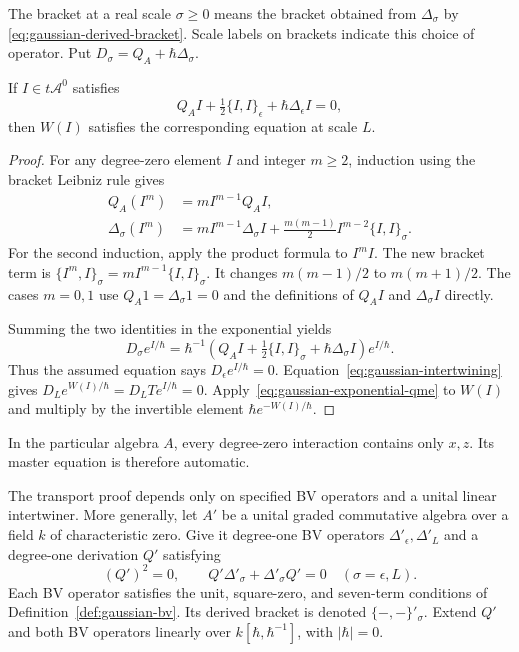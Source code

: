 The bracket at a real scale $\sigma\geq0$ means the bracket obtained from
$\Delta_\sigma$ by
\eqref{eq:gaussian-derived-bracket}. Scale labels on brackets indicate
this choice of operator.
Put $D_\sigma=Q_A+\hbar\Delta_\sigma$.

\begin{proposition}\label{prop:gaussian-qme-transport}
If $I\in t\mathcal A^0$ satisfies
\[
 Q_AI+\tfrac12\{I,I\}_\epsilon+\hbar\Delta_\epsilon I=0,
\]
then $W(I)$ satisfies the corresponding equation at scale $L$.
\end{proposition}

\begin{proof}
For any degree-zero element $I$ and integer $m\geq2$, induction using
the bracket Leibniz rule gives
\[
 \begin{split}
 Q_A(I^m)&=m I^{m-1}Q_AI,\\
 \Delta_\sigma(I^m)&=m I^{m-1}\Delta_\sigma I
              +\frac{m(m-1)}2 I^{m-2}\{I,I\}_\sigma.
 \end{split}
\]
For the second induction, apply the product formula to $I^m I$.
The new bracket term is
$\{I^m,I\}_\sigma=m I^{m-1}\{I,I\}_\sigma$.
It changes $m(m-1)/2$ to $m(m+1)/2$.
The cases $m=0,1$ use $Q_A1=\Delta_\sigma1=0$ and the definitions
of $Q_AI$ and $\Delta_\sigma I$ directly.

Summing the two identities in the exponential yields
\begin{equation}\label{eq:gaussian-exponential-qme}
 D_\sigma e^{I/\hbar}
 =\hbar^{-1}\left(Q_AI+\tfrac12\{I,I\}_\sigma+
                          \hbar\Delta_\sigma I\right)e^{I/\hbar}.
\end{equation}
Thus the assumed equation says $D_\epsilon e^{I/\hbar}=0$.
Equation~\eqref{eq:gaussian-intertwining} gives
$D_L e^{W(I)/\hbar}=D_LT e^{I/\hbar}=0$.
Apply~\eqref{eq:gaussian-exponential-qme} to $W(I)$ and multiply
by the invertible element $\hbar e^{-W(I)/\hbar}$.
\end{proof}

In the particular algebra $A$, every degree-zero interaction contains
only $x,z$. Its master equation is therefore automatic.

The transport proof depends only on specified BV operators and a unital
linear intertwiner. More generally, let $A'$ be a unital graded
commutative algebra over a field $k$ of characteristic zero.
Give it degree-one BV operators $\Delta'_\epsilon,\Delta'_L$ and a
degree-one derivation $Q'$ satisfying
\[
 (Q')^2=0,\qquad
 Q'\Delta'_\sigma+\Delta'_\sigma Q'=0
       \quad(\sigma=\epsilon,L).
\]
Each BV operator satisfies the unit, square-zero, and seven-term
conditions of Definition~\ref{def:gaussian-bv}.
Its derived bracket is denoted $\{-,-\}'_\sigma$.
Extend $Q'$ and both BV operators linearly over $k[\hbar,\hbar^{-1}]$,
with $|\hbar|=0$.


